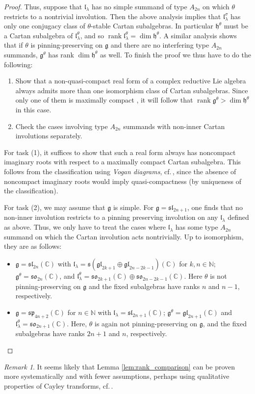 \documentclass{amsart}
\newcommand{\cf}{cf.\,}
\newcommand{\C}{\mathbb{C}}
\newcommand{\g}{\mathfrak{g}}
\newcommand{\gl}{\mathfrak{gl}}
\newcommand{\h}{\mathfrak{h}}
\newcommand{\N}{\mathbb{N}}
\newcommand{\el}{\mathfrak{l}}
\newcommand{\s}{\mathfrak{s}}
\renewcommand{\sl}{\mathfrak{sl}}
\newcommand{\so}{\mathfrak{so}}
\renewcommand{\sp}{\mathfrak{sp}}
\theoremstyle{definition}
\theoremstyle{plain}
\theoremstyle{remark}
\newtheorem{rmk}[defn]{Remark}
\begin{document}
\begin{proof}
    Thus, suppose that $\el_\lambda$ has no simple summand of type $A_{2n}$ on which $\theta$ restricts to a nontrivial involution. Then the above analysis implies that $\el_\lambda^\sigma$ has only one conjugacy class of $\theta$-stable Cartan subalgebras. In particular $\h^\theta$ must be a Cartan subalgebra of $\el_\lambda^\theta$, and so $\operatorname{rank}\el_\lambda^\theta = \dim \h^\theta$. A similar analysis shows that if $\theta$ is pinning-preserving on $\g$ and there are no interfering type $A_{2n}$ summands, $\g^\theta$ has rank $\dim\h^\theta$ as well. To finish the proof we thus have to do the following:
    \begin{enumerate}
        \item Show that a non-quasi-compact real form of a complex reductive Lie algebra always admits more than one isomorphism class of Cartan subalgebras. Since only one of them is maximally compact \cite[Prop.\,6.61]{KnappLG}, it will follow that $\operatorname{rank} \g^\theta > \dim\h^\theta$ in this case.
        \item Check the cases involving type $A_{2n}$ summands with non-inner Cartan involutions separately.
    \end{enumerate}
    For task (1), it suffices to show that such a real form always has noncompact imaginary roots with respect to a maximally compact Cartan subalgebra. This follows from the classification using \emph{Vogan diagrams}, \cf\cite[VI.8]{KnappLG}, since the absence of noncompact imaginary roots would imply quasi-compactness (by uniqueness of the classification).

    For task (2), we may assume that $\g$ is simple. For $\g=\sl_{2n+1}$, one finds that no non-inner involution restricts to a pinning preserving involution on any $\el_\lambda$ defined as above. Thus, we only have to treat the cases where $\el_\lambda$ has some type $A_{2n}$ summand on which the Cartan involution acts nontrivially. Up to isomorphism, they are as follows:
    \begin{itemize}
        \item $\g= \sl_{2n}(\C)$ with $\el_\lambda = \s(\gl_{2k+1}\oplus \gl_{2n-2k-1})(\C)$ for $k,n\in \N$; $\g^\theta = \so_{2n}(\C)$, and $\el_\lambda^\theta = \so_{2k+1}(\C) \oplus \so_{2n-2k-1}(\C)$. 
        Here $\theta$ is not pinning-preserving on $\g$ and the fixed subalgebras have ranks $n$ and $n-1$, respectively.
        \item $\g = \sp_{4n+2}(\C)$ for $n\in \N$ with $\el_\lambda = \sl_{2n+1}(\C)$; $\g^\theta = \gl_{2n+1}(\C)$ and $\el_\lambda^\theta = \so_{2n+1}(\C)$.
        Here, $\theta$ is again not pinning-preserving on $\g$, and the fixed subalgebras have ranks $2n+1$ and $n$, respectively.
    \end{itemize}
\end{proof}
\begin{rmk}
    It seems likely that Lemma \ref{lem:rank_comparison} can be proven more systematically and with fewer assumptions, perhaps using qualitative properties of Cayley transforms, \cf\cite[VI.7]{KnappLG}.
\end{rmk}
\end{document}
